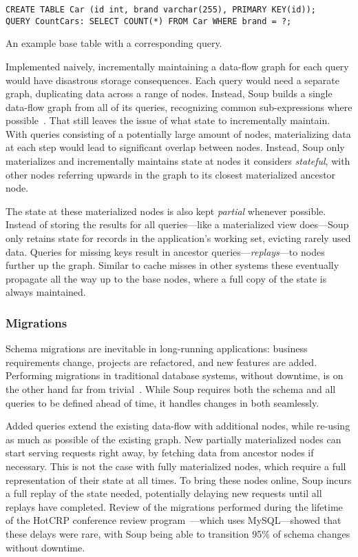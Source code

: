 \begin{listing}[H]
  \begin{verbatim}
CREATE TABLE Car (id int, brand varchar(255), PRIMARY KEY(id));
QUERY CountCars: SELECT COUNT(*) FROM Car WHERE brand = ?;
  \end{verbatim}

  \caption{An example base table with a corresponding
  query.}\label{lst:example-schema}
\end{listing}

Implemented naively, incrementally maintaining a data-flow graph for each query
would have disastrous storage consequences. Each query would need a separate
graph, duplicating data across a range of nodes. Instead, Soup builds a single
data-flow graph from all of its queries, recognizing common sub-expressions
where possible~\cite{common-expression}. That still leaves the issue of what
state to incrementally maintain. With queries consisting of a potentially large
amount of nodes, materializing data at each step would lead to significant
overlap between nodes. Instead, Soup only materializes and incrementally
maintains state at nodes it considers \textit{stateful}, with other nodes
referring upwards in the graph to its closest materialized ancestor node.

The state at these materialized nodes is also kept \textit{partial} whenever
possible. Instead of storing the results for all queries---like a materialized
view does---Soup only retains state for records in the application's working
set, evicting rarely used data. Queries for missing keys result in ancestor
queries---\textit{replays}---to nodes further up the graph. Similar to cache
misses in other systems these eventually propagate all the way up to the base
nodes, where a full copy of the state is always maintained.

\subsubsection{Migrations}

Schema migrations are inevitable in long-running applications: business
requirements change, projects are refactored, and new features are added.
Performing migrations in traditional database systems, without downtime, is on
the other hand far from trivial~\cite{stripe, gh-ost}. While Soup requires both
the schema and all queries to be defined ahead of time, it handles changes in
both seamlessly.

Added queries extend the existing data-flow with additional nodes, while
re-using as much as possible of the existing graph. New partially materialized
nodes can start serving requests right away, by fetching data from ancestor
nodes if necessary. This is not the case with fully materialized nodes, which
require a full representation of their state at all times. To bring these nodes
online, Soup incurs a full replay of the state needed, potentially delaying new
requests until all replays have completed. Review of the migrations performed
during the lifetime of the HotCRP conference review
program~\cite{hotcrp}---which uses MySQL---showed that these delays were rare,
with Soup being able to transition 95\% of schema changes without downtime.

